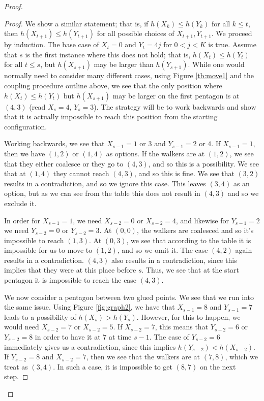 \documentclass[10pt,a4paper]{amsart}
\theoremstyle{definition}
\numberwithin{definition}{section}
\begin{document}
\begin{proof}
\begin{proof}
We show a similar statement; that is, if $h(X_k) \leq h(Y_k)$ for all $k \leq t$, then $h(X_{t+1}) \leq h(Y_{t+1})$ for all possible choices of $X_{t+1}, Y_{t+1}$. We proceed by induction. The base case of $X_t = 0$ and $Y_t = 4j$ for $0 < j < K$ is true. Assume that $s$ is the first instance where this does not hold; that is, $h(X_t) \leq h(Y_t)$ for all $t \leq s$, but $h(X_{s+1})$ may be larger than $h(Y_{s+1})$. While one would normally need to consider many different cases, using Figure \ref{tb:move1} and the coupling procedure outline above, we see that the only position where $h(X_t) \leq h(Y_t)$ but $h(X_{s+1})$ may be larger on the first pentagon is at $(4,3)$ (read $X_s = 4$, $Y_s = 3$). The strategy will be to work backwards and show that it is actually impossible to reach this position from the starting configuration.

Working backwards, we see that $X_{s-1} = 1$ or $3$ and $Y_{s-1} = 2$ or $4$. If $X_{s-1} = 1$, then we have $(1,2)$ or $(1,4)$ as options. If the walkers are at $(1,2)$, we see that they either coalesce or they go to $(4,3)$, and so this is a possibility. We see that at $(1,4)$ they cannot reach $(4,3)$, and so this is fine. We see that $(3,2)$ results in a contradiction, and so we ignore this case. This leaves $(3,4)$ as an option, but as we can see from the table this does not result in $(4,3)$ and so we exclude it.

In order for $X_{s-1} = 1$, we need $X_{s-2} = 0$ or $X_{s-2} = 4$, and likewise for $Y_{s-1} = 2$ we need $Y_{s-2} = 0$ or $Y_{s-2} = 3$. At $(0,0)$, the walkers are coalesced and so it's impossible to reach $(1,3)$. At $(0,3)$, we see that according to the table it is impossible for us to move to $(1,2)$, and so we omit it. The case $(4,2)$ again results in a contradiction. $(4,3)$ also results in a contradiction, since this implies that they were at this place before $s$. Thus, we see that at the start pentagon it is impossible to reach the case $(4,3)$.

We now consider a pentagon between two glued points. We see that we run into the same issue. Using Figure \ref{fig:graph2}, we have that $X_{s-1} = 8$ and $Y_{s-1} = 7$ leads to a possibility of $h(X_s) > h(Y_s)$. However, for this to happen, we would need $X_{s-2} = 7$ or $X_{s-2} = 5$. If $X_{s-2} = 7$, this means that $Y_{s-2} = 6$ or $Y_{s-2} = 8$ in order to have it at $7$ at time $s-1$. The case of $Y_{s-2} = 6$ immediately gives us a contradiction, since this implies $h(Y_{s-2}) < h(X_{s-2})$. If $Y_{s-2} = 8$ and $X_{s-2} = 7$, then we see that the walkers are at $(7,8)$, which we treat as $(3,4)$. In such a case, it is impossible to get $(8,7)$ on the next step.


\end{proof}
\end{proof}
\end{document}
